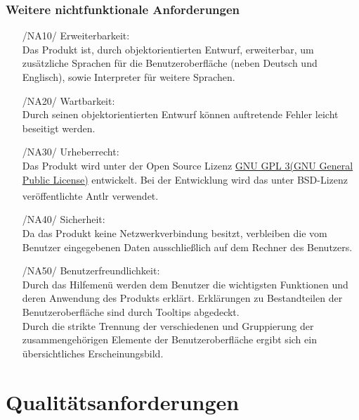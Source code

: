 \documentclass[parskip=full]{scrartcl}
\begin{document}
		\subsubsection{Weitere nichtfunktionale Anforderungen}
		\begin{itemize}
		\item[/NA10/]Erweiterbarkeit: \\
		Das Produkt ist, durch objektorientierten Entwurf, erweiterbar, um zusätzliche Sprachen für die Benutzeroberfläche (neben Deutsch und Englisch), sowie \gls{Interpreter} für weitere Sprachen.
		\item[/NA20/]Wartbarkeit: \\
		Durch seinen objektorientierten Entwurf können auftretende Fehler leicht beseitigt werden. 
		\item[/NA30/]Urheberrecht: \\
		Das Produkt wird unter der Open Source Lizenz \href{https://www.gnu.org/licenses/gpl-3.0.de.html}{GNU GPL 3(GNU General Public License)} entwickelt. Bei der Entwicklung wird das unter BSD-Lizenz veröffentlichte Antlr\textsuperscript{\textcopyright} verwendet.
		\item[/NA40/] Sicherheit: \\
		Da das Produkt keine Netzwerkverbindung besitzt, verbleiben die vom Benutzer eingegebenen Daten ausschließlich auf dem Rechner des Benutzers.
		\item[/NA50/]Benutzerfreundlichkeit: \\
		Durch das Hilfemenü werden dem Benutzer die wichtigsten Funktionen und deren Anwendung des Produkts erklärt. Erklärungen zu Bestandteilen der Benutzeroberfläche sind durch \glspl{Tooltip} abgedeckt. \\
		Durch die strikte Trennung der verschiedenen und Gruppierung der zusammengehörigen Elemente der Benutzeroberfläche ergibt sich ein übersichtliches Erscheinungsbild. 
		\end{itemize}
		

\section{Qualitätsanforderungen}
\end{document}
